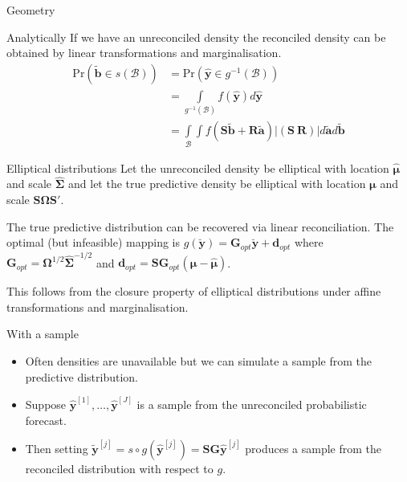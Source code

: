 \documentclass{beamer}
\begin{document}
  \begin{frame}{Geometry}
  	\centering
  	
  \end{frame}
  \begin{frame}{Analytically}
  	If we have an unreconciled density the reconciled density can be obtained by linear transformations and marginalisation.
  	\begin{align*}
  	\mbox{Pr}(\tilde{\bm{b}}\in s(\mathcal{B}))&=\mbox{Pr}(\hat{\bm{y}}\in g^{-1}(\mathcal{B}))\\
  	&=\int\limits_{g^{-1}(\mathcal{B})}f(\hat{\bm{y}})d\hat{\bm{y}}\\
  	&=\int\limits_{\mathcal{B}}\int f(\bm{S}\tilde{\bm{b}}+\bm{R}\tilde{\bm{a}})|\left(\bm{S}~\bm{R}\right)|d\tilde{\bm{a}}d\tilde{\bm{b}}
  	\end{align*}
  \end{frame}
  \begin{frame}{Elliptical distributions}
  	Let the unreconciled density be elliptical with location  $\hat{\bm{\mu}}$ and scale $\hat{\bm{\Sigma}}$ and let the true predictive density be elliptical with location  ${\bm{\mu}}$ and scale ${\bm{S}}{\bm{\Omega}}{\bm{S}}'$.
  	\begin{theorem}
  		The true predictive distribution can be recovered via linear reconciliation.  The optimal (but infeasible) mapping is $g(\breve{\bm y})={\bm G}_{opt}\breve{\bm y}+{\bm d}_{opt}$ where $\bm{G}_{opt}={\bm\Omega}^{1/2}{\bm\hat{\Sigma}}^{-1/2}$ and ${\bm d}_{opt}={\bm S}{\bm G}_{opt}\left({\bm \mu}-\hat{\bm \mu}\right)$.
  	\end{theorem}
    This follows from the closure property of elliptical distributions under affine transformations and marginalisation.
  \end{frame}
  \begin{frame}{With a sample}
  	\begin{itemize}
  		\item Often densities are unavailable but we can simulate a sample from the predictive distribution.
  		\item Suppose $\bm{\hat{y}}^{[1]},\ldots,\bm{\hat{y}}^{[J]}$ is a sample from the unreconciled probabilistic forecast.
  		\item Then setting $\tilde{\bm y}^{[j]}=s\circ g(\hat{\bm y}^{[j]})=\bm{S}\bm{G}\hat{\bm y}^{[j]}$ produces a sample from the reconciled distribution with respect to $g$.
  	\end{itemize}
  \end{frame}
\end{document}
